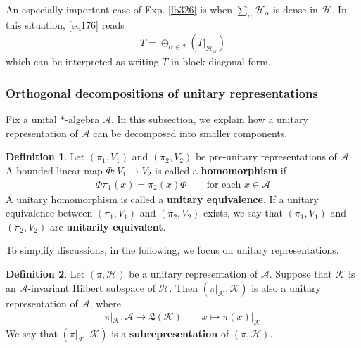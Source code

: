 \documentclass[12pt,b5paper,notitlepage]{article}
\theoremstyle{definition}
\newtheorem{df}{Definition}[subsection]
\theoremstyle{plain}
\newcommand{\fk}{\mathfrak}
\newcommand{\scr}{\mathscr}
\newcommand{\MH}{\mathcal H}
\newcommand{\MK}{\mathcal K}
\newcommand{\SI}{\mathscr I}
\newcommand{\SA}{\mathscr A}
\numberwithin{equation}{section}
\begin{document}
An especially important case of Exp. \ref{lb326} is when $\sum_\alpha\MH_\alpha$ is dense in $\MH$. In this situation, \eqref{eq176} reads
\begin{align*}
T=\oplus_{\alpha\in\SI}(T|_{\MH_\alpha})
\end{align*}
which can be interpreted as writing $T$ in block-diagonal form.



\subsubsection{Orthogonal decompositions of unitary representations}



Fix a unital $*$-algebra $\SA$. In this subsection, we explain how a unitary representation of $\SA$ can be decomposed into smaller components. 


\begin{df}
Let $(\pi_1,V_1)$ and $(\pi_2,V_2)$ be pre-unitary representations of $\SA$. A bounded linear map $\Phi:V_1\rightarrow V_2$ is called a \textbf{homomorphism}  if 
\begin{align*}
\Phi\pi_1(x)=\pi_2(x)\Phi\qquad\text{for each }x\in\SA
\end{align*}
A unitary homomorphism is called a \textbf{unitary equivalence}.  If a unitary equivalence between $(\pi_1,V_1)$ and $(\pi_2,V_2)$ exists, we say that $(\pi_1,V_1)$ and $(\pi_2,V_2)$ are \textbf{unitarily equivalent}.
\end{df}


To simplify discussions, in the following, we focus on unitary representations.


\begin{df}
Let $(\pi,\MH)$ be a unitary representation of $\SA$. Suppose that $\MK$ is an $\scr A$-invariant Hilbert subspace of $\MH$. Then $(\pi|_\MK,\MK)$ is also a unitary representation of $\SA$, where
\begin{align*}
\pi|_\MK:\SA\rightarrow\fk L(\MK)\qquad x\mapsto \pi(x)|_\MK
\end{align*}
We say that $(\pi|_\MK,\MK)$ is a \textbf{subrepresentation}  of $(\pi,\MH)$.
\end{df}
\end{document}
